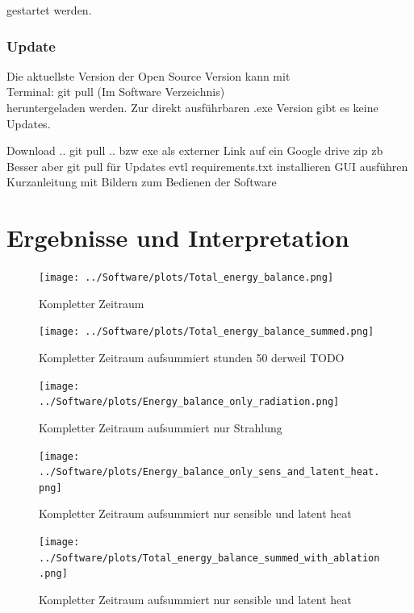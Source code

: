\documentclass[12pt,a4paper]{article}
\begin{document}
gestartet werden.

\subsubsection{Update}
Die aktuellste Version der Open Source Version kann mit \\

Terminal: \textsf{\small git pull} (Im Software Verzeichnis)\\

heruntergeladen werden. Zur direkt ausführbaren .exe Version gibt es keine Updates.





Download .. git pull .. bzw exe als externer Link auf ein Google drive zip zb
Besser aber git pull für Updates evtl
requirements.txt installieren
GUI ausführen
Kurzanleitung mit Bildern zum Bedienen der Software


\pagebreak
\section{Ergebnisse und Interpretation}

\begin{figure}[H]
\centering
\texttt{[image: ../Software/plots/Total\_energy\_balance.png]}
\caption{Kompletter Zeitraum}
\label{fig:..}
\end{figure}

\begin{figure}[H]
\centering
\texttt{[image: ../Software/plots/Total\_energy\_balance\_summed.png]}
\caption{Kompletter Zeitraum aufsummiert stunden 50 derweil TODO}
\label{fig:..}
\end{figure}

\begin{figure}[H]
\centering
\texttt{[image: ../Software/plots/Energy\_balance\_only\_radiation.png]}
\caption{Kompletter Zeitraum aufsummiert nur Strahlung}
\label{fig:..}
\end{figure}


\begin{figure}[H]
\centering
\texttt{[image: ../Software/plots/Energy\_balance\_only\_sens\_and\_latent\_heat.png]}
\caption{Kompletter Zeitraum aufsummiert nur sensible und latent heat}
\label{fig:..}
\end{figure}

\begin{figure}[H]
\centering
\texttt{[image: ../Software/plots/Total\_energy\_balance\_summed\_with\_ablation.png]}
\caption{Kompletter Zeitraum aufsummiert nur sensible und latent heat}
\label{fig:..}
\end{figure}
\end{document}
